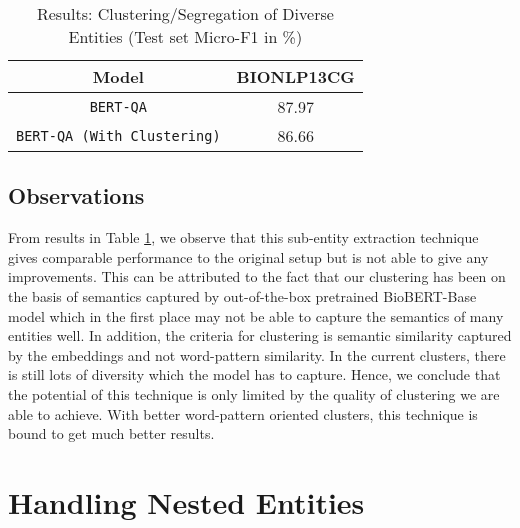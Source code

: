 \begin{table}[h!]
\centering
\begin{tabular}{|c|c|}\hline
	\textbf{Model} & \textbf{BIONLP13CG}\\\hline
	\texttt{BERT-QA} & 87.97\\\hline
	\texttt{BERT-QA (With Clustering)} & 86.66\\\hline
	\end{tabular}
    \caption{Results: Clustering/Segregation of Diverse Entities (Test set Micro-F1 in \%)}
    \label{tab:res_clustering}
\end{table}

\subsection{Observations}
From results in Table \ref{tab:res_clustering}, we observe that this sub-entity extraction technique gives comparable performance to the original setup but is not able to give any improvements. This can be attributed to the fact that our clustering has been on the basis of semantics captured by out-of-the-box pretrained BioBERT-Base model which in the first place may not be able to capture the semantics of many entities well. In addition, the criteria for clustering is semantic similarity captured by the embeddings and not word-pattern similarity. In the current clusters, there is still lots of diversity which the model has to capture. Hence, we conclude that the potential of this technique is only limited by the quality of clustering we are able to achieve. With better word-pattern oriented clusters, this technique is bound to get much better results.

\section{Handling Nested Entities}

